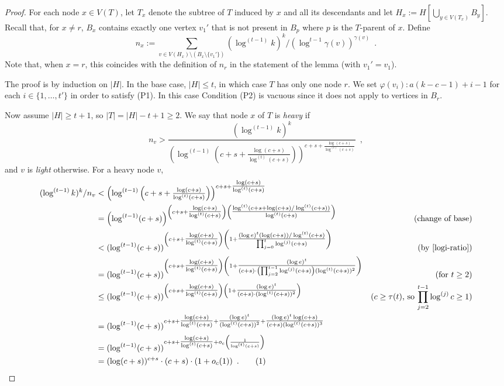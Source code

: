 \documentclass[kpfonts]{patmorin}
\newcommand\numberthis{\addtocounter{equation}{1}\tag{\theequation}}
\theoremstyle{named}
\begin{document}
\begin{proof}
    For each node $x\in V(T)$, let $T_x$ denote the subtree of $T$ induced by $x$ and all its descendants and let $H_x:=H[\bigcup_{y\in V(T_x)} B_y]$. Recall that, for $x\neq r$, $B_x$ contains exactly one vertex $v_1'$ that is not present in $B_p$ where $p$ is the $T$-parent of $x$.  Define
    \[
        n_x:=\sum_{v\in V(H_x)\setminus (B_x\setminus \{v_1'\})}(\log^{(t-1)} k)^k/(\log^{t-1}\gamma(v))^{\gamma(v)} \enspace .
    \]
    Note that, when $x=r$, this coincides with the definition of $n_r$ in the statement of the lemma (with $v_1'=v_1$).

    The proof is by induction on $|H|$.  In the base case, $|H|\le t$, in which case $T$ has only one node $r$. We set $\varphi(v_i):a(k-c-1)+i-1$ for each $i\in\{1,\ldots,t'\}$ in order to satisfy (P1).  In this case Condition (P2) is vacuous since it does not apply to vertices in $B_r$.

    Now assume $|H|\ge t+1$, so $|T|=|H|-t+1\ge 2$.  We say that node $x$ of $T$ is \emph{heavy} if
    \[
        n_v > \frac{(\log^{(t-1)} k)^k}{\left(\log^{(t-1)}\left(c+s+\tfrac{\log(c+s)}{\log^{(t)}(c+s)}\right)\right)^{c+s+\tfrac{\log(c+s)}{\log^{(t)}(c+s)}}} \enspace ,
    \]
    and $v$ is \emph{light} otherwise.  For a heavy node $v$,
    \begin{align*}
        (\log^{(t-1)} k)^k/n_v & < \left(\log^{(t-1)}\left(c+s+\tfrac{\log(c+s)}{\log^{(t)}(c+s)}\right)\right)^{c+s+\tfrac{\log(c+s)}{\log^{(t)}(c+s)}} \\
        & = \left(\log^{(t-1)}(c+s)\right)^{\left(c+s+\tfrac{\log(c+s)}{\log^{(t)}(c+s)}\right)
            \left(\tfrac{\log^{(t)}(c+s+\log(c+s)/\log^{(t)}(c+s))}{\log^{(t)}(c+s)}\right)}
            & \text{(change of base)} \\
        & < (\log^{(t-1)}(c+s))^{\left(c+s+\tfrac{\log(c+s)}{\log^{(t)}(c+s)}\right)
            \left(1 + \tfrac{(\log e)^t(\log(c+s))/\log^{(t)}(c+s)}{\prod_{j=0}^{t}\log^{(j)}(c+s)}\right)}
            & \text{(by \cref{logi-ratio})}\\
        & = (\log^{(t-1)}(c+s))^{\left(c+s+\tfrac{\log(c+s)}{\log^{(t)}(c+s)}\right)
            \left(1 + \tfrac{(\log e)^t}{(c+s)\cdot\left(\prod_{j=2}^{t-1}\log^{(j)}(c+s)\right)(\log^{(t)}(c+s))^2}\right)} &
            \text{(for $t\ge 2$)}\\
        & \le (\log^{(t-1)}(c+s))^{\left(c+s+\tfrac{\log(c+s)}{\log^{(t)}(c+s)}\right)
            \left(1 + \tfrac{(\log e)^t}{(c+s)\cdot(\log^{(t)}(c+s))^2}\right)}
            & \text{($c\ge \tau(t)$, so $\prod_{j=2}^{t-1}\log^{(j)}c\ge 1$)} \\
        & = (\log^{(t-1)}(c+s))^{c+s+\tfrac{\log(c+s)}{\log^{(t)}(c+s)} +
            \tfrac{(\log e)^t}{(\log^{(t)}(c+s))^2} + \tfrac{(\log e)^t\log(c+s)}{(c+s)(\log^{(t)}(c+s))^3}}  \\
        & = (\log^{(t-1)}(c+s))^{c+s+\tfrac{\log(c+s)}{\log^{(t)}(c+s)} + o_c\left(\frac{1}{\log^{(t)}(c+s)}\right)}  \\
        & = (\log(c+s))^{c+s}\cdot (c+s)\cdot (1+o_c(1)) \enspace .
        \numberthis \label{sizer}
    \end{align*}


\end{proof}
\end{document}
